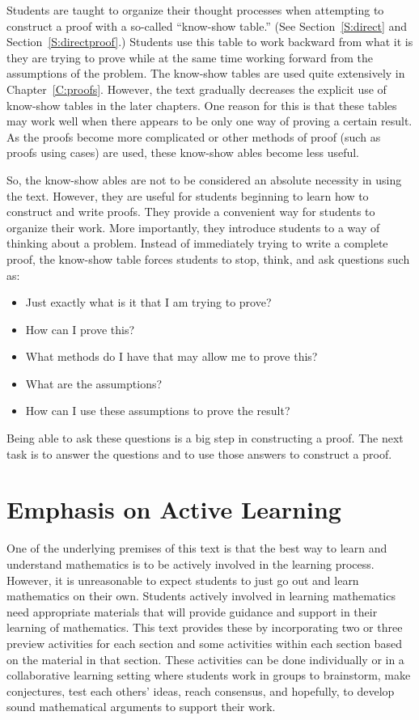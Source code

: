 Students are taught to organize their thought processes when attempting to construct a proof with a so-called ``know-show table.'' (See Section~\ref{S:direct} and Section~\ref{S:directproof}.)  Students use this table to work backward from what it is they are trying to prove while at the same time working forward from the assumptions of the problem.  The know-show tables are used quite extensively in Chapter~\ref{C:proofs}.  However, the text gradually decreases the explicit use of know-show tables in the later chapters.  One reason for this is that these tables may work well when there appears to be only one way of proving a certain result.  As the proofs become more complicated or other methods of proof (such as proofs using cases) are used, these know-show ables become less useful.


So, the know-show ables are not to be considered an absolute necessity in using the text.  However, they are useful for students beginning to learn how to construct and write proofs.  They provide a convenient way for students to organize their work.  More importantly, they introduce students to a way of thinking about a problem.  Instead of immediately trying to write a complete proof, the know-show table forces students to stop, think, and ask questions such as:

\begin{itemize}
\item Just exactly what is it that I am trying to prove?
\item How can I prove this?
\item What methods do I have that may allow me to prove this?
\item What are the assumptions?
\item How can I use these assumptions to prove the result?
\end{itemize}

Being able to ask these questions is a big step in constructing a proof.  The next task is to answer the questions and to use those answers to construct a proof.
\hbreak

\section*{Emphasis on Active Learning}

One of the underlying premises of this text is that the best way to learn and understand mathematics is to be actively involved in the learning process.  However, it is unreasonable to expect students to just go out and learn mathematics on their own.  Students actively involved in learning mathematics need appropriate materials that will provide guidance and support in their learning of mathematics.  This text provides these by incorporating two or three preview activities for each section and some activities within each section based on the material in that section.  These activities can be done individually or in a collaborative learning setting where students work in groups to brainstorm, make conjectures, test each others' ideas, reach consensus, and hopefully, to develop sound mathematical arguments to support their work.

